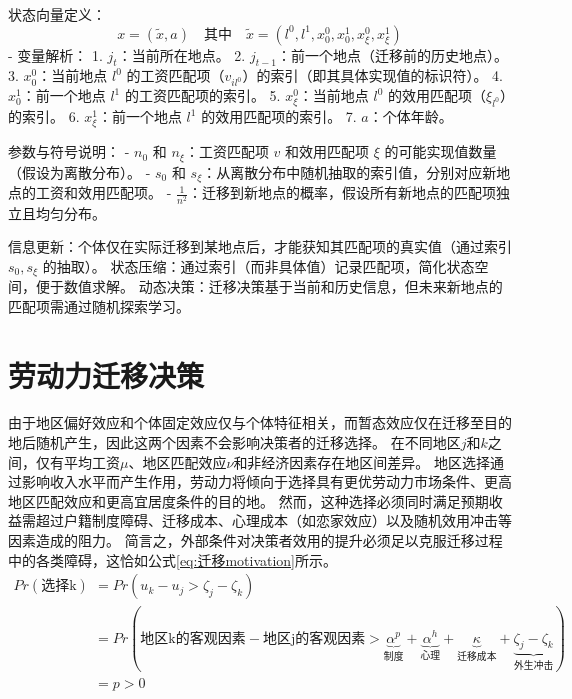 \documentclass[a4paper,12pt,oneside]{book} %
\begin{document}
状态向量定义：
\[ x = (\tilde{x}, a) \quad \text{其中} \quad \tilde{x} = (l^0, l^1, x_0^0, x_0^1, x_\xi^0, x_\xi^1) \]
- 变量解析：
  1. $j_t$：当前所在地点。
  2. $j_{t-1}$：前一个地点（迁移前的历史地点）。
  3. $x_0^0$：当前地点 $l^0$ 的工资匹配项（$v_{il^0}$）的索引（即其具体实现值的标识符）。
  4. $x_0^1$：前一个地点 $l^1$ 的工资匹配项的索引。
  5. $x_\xi^0$：当前地点 $l^0$ 的效用匹配项（$\xi_{l^0}$）的索引。
  6. $x_\xi^1$：前一个地点 $l^1$ 的效用匹配项的索引。
  7. $a$：个体年龄。

参数与符号说明：
- $n_0$ 和 $n_\xi$：工资匹配项 $v$ 和效用匹配项 $\xi$ 的可能实现值数量（假设为离散分布）。
- $s_0$ 和 $s_\xi$：从离散分布中随机抽取的索引值，分别对应新地点的工资和效用匹配项。
- $\frac{1}{n^2}$：迁移到新地点的概率，假设所有新地点的匹配项独立且均匀分布。

信息更新：个体仅在实际迁移到某地点后，才能获知其匹配项的真实值（通过索引 $s_0, s_\xi$ 的抽取）。
状态压缩：通过索引（而非具体值）记录匹配项，简化状态空间，便于数值求解。
动态决策：迁移决策基于当前和历史信息，但未来新地点的匹配项需通过随机探索学习。







\section{劳动力迁移决策}

由于地区偏好效应和个体固定效应仅与个体特征相关，而暂态效应仅在迁移至目的地后随机产生，因此这两个因素不会影响决策者的迁移选择。
在不同地区$j$和$k$之间，仅有平均工资$\mu$、地区匹配效应$\nu$和非经济因素存在地区间差异。
地区选择通过影响收入水平而产生作用，劳动力将倾向于选择具有更优劳动力市场条件、更高地区匹配效应和更高宜居度条件的目的地。
然而，这种选择必须同时满足预期收益需超过户籍制度障碍、迁移成本、心理成本（如恋家效应）以及随机效用冲击等因素造成的阻力。
简言之，外部条件对决策者效用的提升必须足以克服迁移过程中的各类障碍，这恰如公式\ref{eq:迁移motivation}所示。
\begin{equation}
\begin{split}
  Pr(\text{选择k})&= Pr(u_k - u_j > \zeta_j - \zeta_k) 
  \\&= Pr(
  \text{地区k的客观因素} - \text{地区j的客观因素} 
  > 
  \underbrace{\alpha^p}_{\text{制度}} + \underbrace{\alpha^h}_{\text{心理}} + \underbrace{\kappa}_{\text{迁移成本}} + \underbrace{
  \zeta_j - \zeta_k}_{\text{外生冲击}} 
  )
  \\&= p >0
\end{split}
\label{eq:迁移motivation}
\end{equation}
\end{document}
